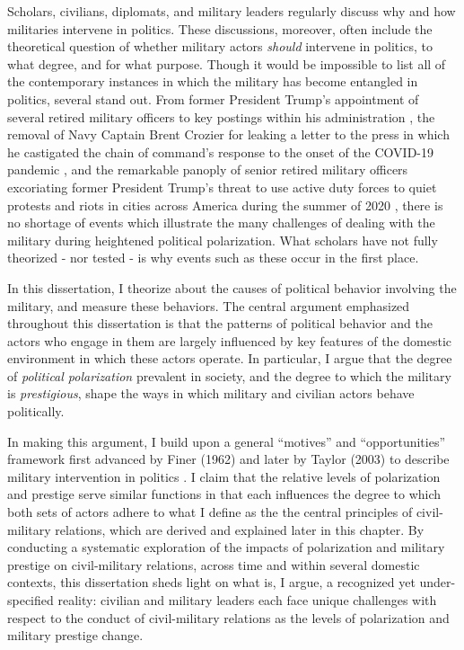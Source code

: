 \documentclass[
  12pt,
  oneside]{memoir}
\begin{document}
Scholars, civilians, diplomats, and military leaders regularly discuss why and how militaries intervene in politics. These discussions, moreover, often include the theoretical question of whether military actors \emph{should} intervene in politics, to what degree, and for what purpose.
Though it would be impossible to list all of the contemporary instances in which the military has become entangled in politics, several stand out. From former President Trump's appointment of several retired military officers to key postings within his administration \autocite{brooks_dont_2016}, the removal of Navy Captain Brent Crozier for leaking a letter to the press in which he castigated the chain of command's response to the onset of the COVID-19 pandemic \autocite{associated_press_teddy_2020}, and the remarkable panoply of senior retired military officers excoriating former President Trump's threat to use active duty forces to quiet protests and riots in cities across America during the summer of 2020 \autocite{brooks_let_2020-1}, there is no shortage of events which illustrate the many challenges of dealing with the military during heightened political polarization. What scholars have not fully theorized - nor tested - is why events such as these occur in the first place.

In this dissertation, I theorize about the causes of political behavior involving the military, and measure these behaviors. The central argument emphasized throughout this dissertation is that the patterns of political behavior and the actors who engage in them are largely influenced by key features of the domestic environment in which these actors operate. In particular, I argue that the degree of \emph{political polarization} prevalent in society, and the degree to which the military is \emph{prestigious}, shape the ways in which military and civilian actors behave politically.

In making this argument, I build upon a general ``motives'' and ``opportunities'' framework first advanced by Finer (1962) and later by Taylor (2003) to describe military intervention in politics \autocite{finer_man_1962,taylor_politics_2003}. I claim that the relative levels of polarization and prestige serve similar functions in that each influences the degree to which both sets of actors adhere to what I define as the the central principles of civil-military relations, which are derived and explained later in this chapter. By conducting a systematic exploration of the impacts of polarization and military prestige on civil-military relations, across time and within several domestic contexts, this dissertation sheds light on what is, I argue, a recognized yet under-specified reality: civilian and military leaders each face unique challenges with respect to the conduct of civil-military relations as the levels of polarization and military prestige change.
\end{document}
